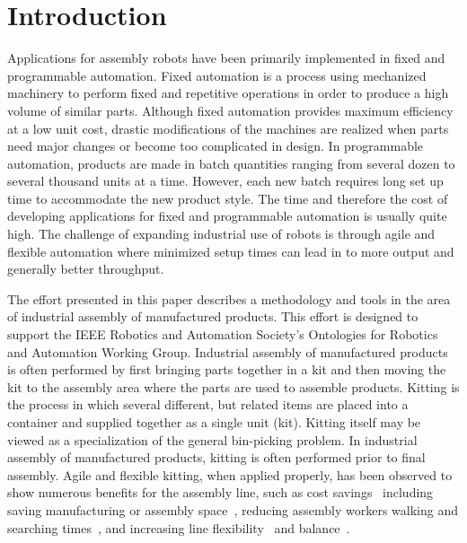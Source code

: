 \section{Introduction}

Applications for assembly robots have been primarily implemented in fixed and programmable automation. Fixed automation is a process using mechanized machinery to perform fixed and repetitive operations in order to produce a high volume of similar parts. Although fixed automation provides maximum efficiency at a low unit cost, drastic modifications of the machines are realized when parts need major changes or become too complicated in design. In programmable automation, products are made in batch quantities ranging from several dozen to several thousand units at a time. However, each new batch requires long set up time to accommodate the new product style. The time and therefore the cost of developing applications for fixed and programmable automation is usually quite high. The challenge of expanding industrial use of robots is through agile and flexible automation where minimized setup times can lead in to more output and generally better throughput.

The effort presented in this paper describes a methodology and tools in the area of industrial assembly of manufactured products. This effort is designed to support the IEEE Robotics and Automation Society's Ontologies for Robotics and Automation Working Group. Industrial assembly of manufactured products is often performed by first bringing parts together in a kit and then moving the kit to the assembly area where the parts are used to assemble products. Kitting is the process in which several different, but related items are placed into a container and supplied together as a single unit (kit). Kitting itself may be viewed as a specialization of the general bin-picking problem. In industrial assembly of manufactured products, kitting is often performed prior to final assembly. Agile and flexible kitting, when applied properly, has been observed to show numerous benefits for the assembly line, such as cost savings~\cite{Carlsson_2008} including saving manufacturing or assembly space~\cite{Medbo2003}, reducing assembly workers walking and searching times~\cite{Schwind1992}, and increasing line flexibility~\cite{Bozer1992} and balance~\cite{Jiao2000}.


